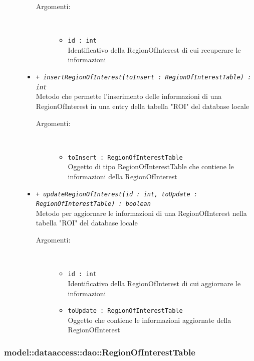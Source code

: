 \documentclass[../DefinizioneDiProdotto.tex]{subfiles}
\begin{document}
\begin{description}
\begin{itemize}
 \begin{description}
\item[Argomenti:] \
\begin{itemize}
\item \texttt{id : int}\\
Identificativo della RegionOfInterest di cui recuperare le informazioni\end{itemize}
\end{description}
\item \texttt{+ \textit{insertRegionOfInterest(toInsert : RegionOfInterestTable) : int}}\\
Metodo che permette l'inserimento delle informazioni di una RegionOfInterest in una entry della tabella "ROI" del database locale
 \begin{description}
\item[Argomenti:] \
\begin{itemize}
\item \texttt{toInsert : RegionOfInterestTable}\\
Oggetto di tipo RegionOfInterestTable che contiene le informazioni della RegionOfInterest\end{itemize}
\end{description}
\item \texttt{+ \textit{updateRegionOfInterest(id : int, toUpdate : RegionOfInterestTable) : boolean}}\\
Metodo per aggiornare le informazioni di una RegionOfInterest nella tabella "ROI" del database locale
 \begin{description}
\item[Argomenti:] \
\begin{itemize}
\item \texttt{id : int}\\
Identificativo della RegionOfInterest di cui aggiornare le informazioni\item \texttt{toUpdate : RegionOfInterestTable}\\
Oggetto che contiene le informazioni aggiornate della RegionOfInterest\end{itemize}
\end{description}
\end{itemize}
\end{description}

\subsubsection{model::dataaccess::dao::RegionOfInterestTable}
\end{document}

